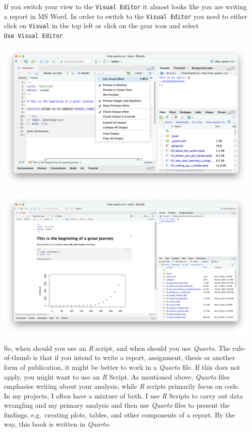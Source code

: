 \documentclass[
  letterpaper,
]{krantz}
\begin{document}
If you switch your view to the \texttt{Visual\ Editor} it almost looks
like you are writing a report in MS Word. In order to switch to the
\texttt{Visual\ Editor} you need to either click on \texttt{Visual} in
the top left or click on the gear icon and select
\texttt{Use\ Visual\ Editor}.

\includegraphics{images/chapter_06_img/03_r_markdown/02_quarto_visual_editor_menu.png}

\includegraphics{images/chapter_06_img/03_r_markdown/03_quarto_visual_editor.png}

So, when should you use an \emph{R} script, and when should you use
\emph{Quarto}. The rule-of-thumb is that if you intend to write a
report, assignment, thesis or another form of publication, it might be
better to work in a \emph{Quarto} file. If this does not apply, you
might want to use an \emph{R} Script. As mentioned above, \emph{Quarto}
files emphasise writing about your analysis, while \emph{R} scripts
primarily focus on code. In my projects, I often have a mixture of both.
I use \emph{R} Scripts to carry out data wrangling and my primary
analysis and then use \emph{Quarto} files to present the findings,
e.g.~creating plots, tables, and other components of a report. By the
way, this book is written in \emph{Quarto}.
\end{document}
